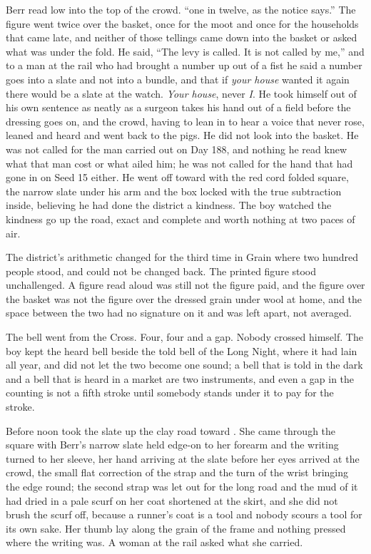 Berr read low into the top of the crowd. “one in twelve, as the notice says.” The figure went twice over the basket, once for the moot and once for the households that came late, and neither of those tellings came down into the basket or asked what was under the fold. He said, “The levy is called. It is not called by me,” and to a man at the rail who had brought a number up out of a fist he said a number goes into a slate and not into a bundle, and that if \emph{your house} wanted it again there would be a slate at the watch. \emph{Your house}, never \emph{I}. He took himself out of his own sentence as neatly as a surgeon takes his hand out of a field before the dressing goes on, and the crowd, having to lean in to hear a voice that never rose, leaned and heard and went back to the pigs. He did not look into the basket. He was not called for the man carried out on Day 188, and nothing he read knew what that man cost or what ailed him; he was not called for the hand that had gone in on Seed 15 either. He went off toward  with the red cord folded square, the narrow slate under his arm and the box locked with the true subtraction inside, believing he had done the district a kindness. The boy watched the kindness go up the road, exact and complete and worth nothing at two paces of air.

The district's arithmetic changed for the third time in Grain where two hundred people stood, and could not be changed back. The printed figure stood unchallenged. A figure read aloud was still not the figure paid, and the figure over the basket was not the figure over the dressed grain under wool at home, and the space between the two had no signature on it and was left apart, not averaged.

The bell went from the Cross. Four, four and a gap. Nobody crossed himself. The boy kept the heard bell beside the told bell of the Long Night, where it had lain all year, and did not let the two become one sound; a bell that is told in the dark and a bell that is heard in a market are two instruments, and even a gap in the counting is not a fifth stroke until somebody stands under it to pay for the stroke.

\scenebreak

Before noon  took the slate up the clay road toward . She came through the square with Berr's narrow slate held edge-on to her forearm and the writing turned to her sleeve, her hand arriving at the slate before her eyes arrived at the crowd, the small flat correction of the strap and the turn of the wrist bringing the edge round; the second strap was let out for the long road and the mud of it had dried in a pale scurf on her coat shortened at the skirt, and she did not brush the scurf off, because a runner's coat is a tool and nobody scours a tool for its own sake. Her thumb lay along the grain of the frame and nothing pressed where the writing was. A woman at the rail asked what she carried.

